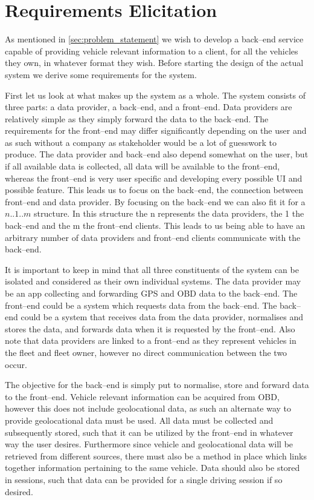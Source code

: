 \section{Requirements Elicitation}\label{sec:requirements_elicitation}
As mentioned in \cref{sec:problem_statement} we wish to develop a back--end service capable of providing vehicle relevant information to a client, for all the vehicles they own, in whatever format they wish.
Before starting the design of the actual system we derive some requirements for the system.

First let us look at what makes up the system as a whole. 
The system consists of three parts: a data provider, a back--end, and a front--end.
Data providers are relatively simple as they simply forward the data to the back--end.
The requirements for the front--end may differ significantly depending on the user and as such without a company as stakeholder would be a lot of guesswork to produce.
The data provider and back--end also depend somewhat on the user, but if all available data is collected, all data will be available to the front--end, whereas the front--end is very user specific and developing every possible UI and possible feature.
This leads us to focus on the back--end, the connection between front--end and data provider. 
By focusing on the back--end we can also fit it for a $n..1..m$ structure.
In this structure the n represents the data providers, the 1 the back--end and the m the front--end clients.
This leads to us being able to have an arbitrary number of data providers and front--end clients communicate with the back--end.

It is important to keep in mind that all three constituents of the system can be isolated and considered as their own individual systems.
The data provider may be an app collecting and forwarding GPS and \ac{OBD} data to the back--end.
The front--end could be a system which requests data from the back--end.
The back--end could be a system that receives data from the data provider, normalises and stores the data, and forwards data when it is requested by the front--end.
Also note that data providers are linked to a front--end as they represent vehicles in the fleet and fleet owner, however no direct communication between the two occur.

\bigskip \noindent
The objective for the back--end is simply put to normalise, store and forward data to the front--end.
Vehicle relevant information can be acquired from \ac{OBD}, however this does not include geolocational data, as such an alternate way to provide geolocational data must be used.
All data must be collected and subsequently stored, such that it can be utilized by the front--end in whatever way the user desires.
Furthermore since vehicle and geolocational data will be retrieved from different sources, there must also be a method in place which links together information pertaining to the same vehicle.
Data should also be stored in sessions, such that data can be provided for a single driving session if so desired.

